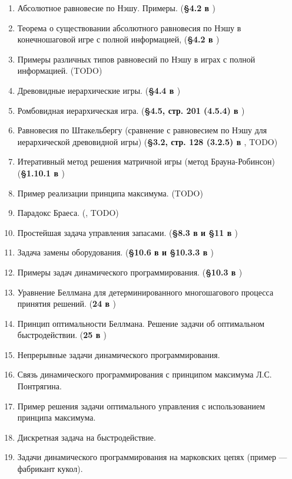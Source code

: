\documentclass[a4paper,14pt]{extarticle}
\begin{document}
\begin{enumerate}
    \item Абсолютное равновесие по Нэшу. Примеры.
        (\textbf{\S 4.2 в \cite{gametheory-2012}})
    \item Теорема о существовании абсолютного равновесия по Нэшу в конечношаговой игре с полной информацией,
        (\textbf{\S 4.2 в \cite{gametheory-2012}})
    \item Примеры различных типов равновесий по Нэшу в играх с полной информацией.
        (TODO)
    \item Древовидные иерархические игры.
        (\textbf{\S 4.4 в \cite{gametheory-2012}})
    \item Ромбовидная иерархическая игра.
        (\textbf{\S 4.5, стр. 201 (4.5.4) в \cite{gametheory-2012}})
    \item Равновесия по Штакельбергу (сравнение с равновесием по Нэшу для иерархической древовидной игры)
        (\textbf{\S 3.2, стр. 128 (3.2.5) в \cite{gametheory-2012}}, TODO)
    \item Итеративный метод решения матричной игры (метод Брауна-Робинсон)
        (\textbf{\S 1.10.1 в \cite{gametheory-2012}})
    \item Пример реализации принципа максимума.
        (TODO)
    \item Парадокс Браеса.
        (\textbf{\cite{wiki-braess-ru}}, TODO) %
    \item Простейшая задача управления запасами.
        (\textbf{\S 8.3 в \cite{vagner-2-1983} и \S 11 в \cite{taha-2002}})
    \item Задача замены оборудования.
        (\textbf{\S 10.6 в \cite{vagner-2-1983} и \S 10.3.3 в \cite{taha-2002}})
    \item Примеры задач динамического программирования.
        (\textbf{\S 10.3 в \cite{taha-2002}})
    \item Уравнение Беллмана для детерминированного многошагового процесса принятия решений.
        (\textbf{24 в \cite{sharshukov-xyz}})
    \item Принцип оптимальности Беллмана. Решение задачи об оптимальном быстродействии.
        (\textbf{25 в \cite{sharshukov-xyz}})
    \item Непрерывные задачи динамического программирования.
    \item Связь динамического программирования с принципом максимума Л.С. Понтрягина.
    \item Пример решения задачи оптимального управления с использованием принципа максимума.
    \item Дискретная задача на быстродействие.
    \item Задачи динамического программирования на марковских цепях (пример --- фабрикант кукол).
\end{enumerate}

\custombibliography
\end{document}

